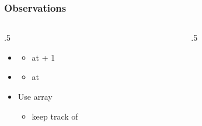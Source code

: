 \documentclass{beamer}
\begin{document}
\begin{frame}\frametitle{Observations}
	\begin{columns}[T] %
	\begin{column}{.5\linewidth} %
		\begin{itemize}
			\item
				\begin{itemize}
					\item 
					at   + 1
				\end{itemize}			

			\item
				\begin{itemize}
					\item 
					at  
				\end{itemize}			
			\item
			Use array
				\begin{itemize}
					\item 
					keep track of  
				\end{itemize}			
		\end{itemize}
	\end{column} %
	\begin{column}{.5\linewidth} %
	

\end{column}
\end{columns}
\end{frame}
\end{document}
